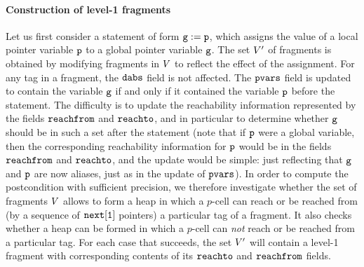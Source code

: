 \paragraph{{\bf Construction of level-1 fragments}}
Let us first consider a statement of form $\mathtt{g} := \mathtt{p}$,
which assigns the value of a local pointer variable $\mathtt{p}$ to a global
pointer variable $\mathtt{g}$. The set $V'$ of fragments is obtained by
modifying fragments in $V$ to reflect the effect of the assignment. 
For any tag in a fragment, the $\mathtt{dabs}$ field is not affected.
The $\mathtt{pvars}$ field  is updated to contain the variable $\mathtt{g}$ if and only if it contained the variable $\mathtt{p}$ before the statement. 
The difficulty is to update the reachability information represented
by the fields $\mathtt{reachfrom}$ and $\mathtt{reachto}$,
and in particular to determine whether $\mathtt{g}$ should be in such a
set after the statement
(note that if $\mathtt{p}$ were a global variable, then the corresponding
reachability information for $\mathtt{p}$ would be in the fields
$\mathtt{reachfrom}$ and $\mathtt{reachto}$, and the update would be simple: just
reflecting that $\mathtt{g}$ and $\mathtt{p}$ are now aliases, just as
in the update of $\mathtt{pvars}$).
In order to compute the postcondition with sufficient precision, we
therefore investigate whether the set of fragments $V$
allows to form a heap in which a $p$-cell can reach or be
reached from (by a sequence of $\tt next[1]$ pointers)
a particular tag of a fragment.
It also checks whether a heap can be formed
in which a $p$-cell can {\em not} reach or be reached from a particular tag.
For each
case that succeeds, the set $V'$ will contain a level-1 fragment with
corresponding contents of its $\mathtt{reachto}$ and $\mathtt{reachfrom}$ fields.


